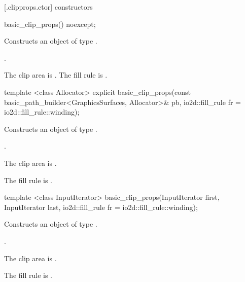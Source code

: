  [\iotwod.clipprops.ctor] { constructors}

%
\begin{itemdecl}
basic_clip_props() noexcept;
\end{itemdecl}
\begin{itemdescr}
\pnum
\effects
Constructs an object of type .

\pnum
\postconditions
{}.

\pnum
\remarks
The clip area is . The fill rule is .
\end{itemdescr}

%
\begin{itemdecl}
template <class Allocator>
explicit basic_clip_props(const basic_path_builder<GraphicsSurfaces, Allocator>& pb,
  io2d::fill_rule fr = io2d::fill_rule::winding);
\end{itemdecl}
\begin{itemdescr}
\pnum
\effects
Constructs an object of type .

\pnum
\postconditions
{}.

\remarks
\pnum
The clip area is .

\pnum
The fill rule is .
\end{itemdescr}

%
\begin{itemdecl}
template <class InputIterator>
basic_clip_props(InputIterator first, InputIterator last,
  io2d::fill_rule fr = io2d::fill_rule::winding);
\end{itemdecl}
\begin{itemdescr}
\pnum
\effects
Constructs an object of type .

\pnum
\postconditions
{}.

\remarks
\pnum
The clip area is .

\pnum
The fill rule is .
\end{itemdescr}

